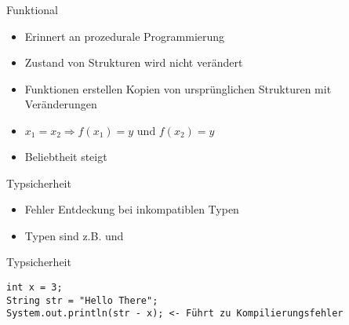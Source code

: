 \begin{frame}{Funktional}
    \begin{itemize}
        \item Erinnert an prozedurale Programmierung
        \item Zustand von Strukturen wird nicht verändert
        \item Funktionen erstellen Kopien von ursprünglichen Strukturen mit Veränderungen
        \item $x_1 = x_2 \Rightarrow f(x_1) = y \text{ und } f(x_2) = y$
        \item Beliebtheit steigt
    \end{itemize}

\end{frame}

\begin{frame}[fragile]{Typsicherheit}
    \begin{itemize}
        \item Fehler Entdeckung bei inkompatiblen Typen
        \item Typen sind z.B.  und 
    \end{itemize}
    \begin{javabox}{Typsicherheit}
        \begin{lstlisting}[style=java]
int x = 3;
String str = "Hello There";
System.out.println(str - x); <- Führt zu Kompilierungsfehler
        \end{lstlisting}
    \end{javabox}

\end{frame}

